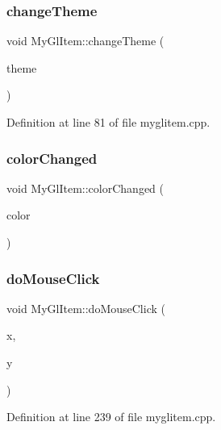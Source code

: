 \subsubsection{\texorpdfstring{changeTheme}{changeTheme}}
{\footnotesize\ttfamily void My\+Gl\+Item\+::change\+Theme (\begin{DoxyParamCaption}\item[{int}]{theme }\end{DoxyParamCaption})\hspace{0.3cm}{\ttfamily [slot]}}



Definition at line 81 of file myglitem.\+cpp.

\mbox{\label{class_my_gl_item_a7bab02e6f11d653e97b328a953d81c82}} 
\subsubsection{\texorpdfstring{colorChanged}{colorChanged}}
{\footnotesize\ttfamily void My\+Gl\+Item\+::color\+Changed (\begin{DoxyParamCaption}\item[{Q\+String}]{color }\end{DoxyParamCaption})\hspace{0.3cm}{\ttfamily [signal]}}

\mbox{\label{class_my_gl_item_a76e20888c579fb444dc071a43a301ced}} 
\subsubsection{\texorpdfstring{doMouseClick}{doMouseClick}}
{\footnotesize\ttfamily void My\+Gl\+Item\+::do\+Mouse\+Click (\begin{DoxyParamCaption}\item[{int}]{x,  }\item[{int}]{y }\end{DoxyParamCaption})\hspace{0.3cm}{\ttfamily [slot]}}



Definition at line 239 of file myglitem.\+cpp.

\mbox{\label{class_my_gl_item_aede114472dca4859706ee76de910e7bf}} 
